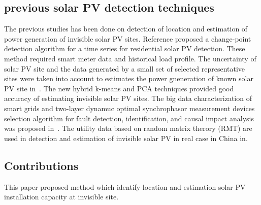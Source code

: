\subsection{previous solar PV detection techniques}
The previous studies has been done on detection of location and estimation of power generation of invisible solar PV sites.
Reference \cite{b11} proposed a change-point detection algorithm for a time series for residential solar PV detection. These method required smart meter data and historical load profile.
The uncertainty of solar PV site and the data generated by a small set of selected representative sites were taken into account to estimates the power gneneration of known solar PV site in~\cite{b12}.  The new hybrid k-means and PCA techniques provided good accuracy of estimating invisible solar PV sites.
The big data characterization of smart grids and two-layer dynamuc optimal synchrophasor measurement devices selection algorithm for fault detection, identification, and causal impact analysis was proposed in~\cite{b13}.
The utility data based on random matrix therory (RMT) are used in detection and estimation of invisible solar PV in real case in China in\cite{b14}.

\subsection{Contributions}
This paper proposed method which identify location and estimation solar PV installation capacity at invisible site.
